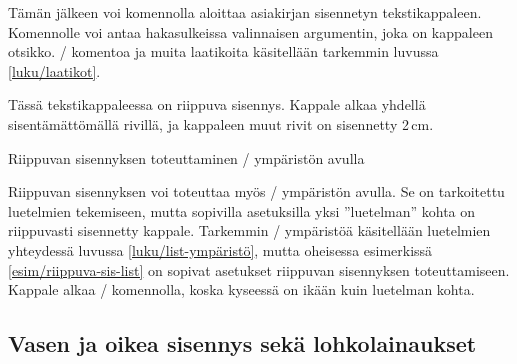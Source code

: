 \begin{koodilohkosis}
\newlength{\sarkain}
\setlength{\sarkain}{2.3cm}
\newcommand{\kappale}[1][]{\par\hangpara{2\sarkain}{1}%
  \makebox[2\sarkain][l]{\ignorespaces #1}\ignorespaces}
\end{koodilohkosis}

Tämän jälkeen voi komennolla  aloittaa asiakirjan
sisennetyn tekstikappaleen. Komennolle voi antaa hakasulkeissa
valinnaisen argumentin, joka on kappaleen otsikko. \-/
komentoa ja muita laatikoita käsitellään tarkemmin luvussa
\ref{luku/laatikot}.

\begin{esimerkki*}
  \komentoi{,}

\begin{koodilohko}
\begin{list}{}{
    \setlength{\leftmargin}{2cm}
    \setlength{\itemindent}{-2cm}
  }
\item Tässä tekstikappaleessa on riippuva sisennys. Kappale alkaa
  yhdellä sisentämättömällä rivillä, ja kappaleen muut rivit on
  sisennetty 2\,cm.
\end{list}
\end{koodilohko}
  \caption{Riippuvan sisennyksen toteuttaminen \-/
    ympäristön avulla}
  \label{esim/riippuva-sis-list}
\end{esimerkki*}

Riippuvan sisennyksen voi toteuttaa myös \-/ ympäristön
avulla. Se on tarkoitettu luetelmien tekemiseen, mutta sopivilla
asetuksilla yksi ''luetelman'' kohta on riippuvasti sisennetty kappale.
Tarkemmin \-/ ympäristöä käsitellään luetelmien
yhteydessä luvussa \ref{luku/list-ympäristö}, mutta oheisessa
esimerkissä \ref{esim/riippuva-sis-list} on sopivat asetukset riippuvan
sisennyksen toteuttamiseen. Kappale alkaa \-/ komennolla,
koska kyseessä on ikään kuin luetelman kohta.

\subsection{Vasen ja oikea sisennys sekä lohkolainaukset}
\label{luku/lohkolainaukset}

